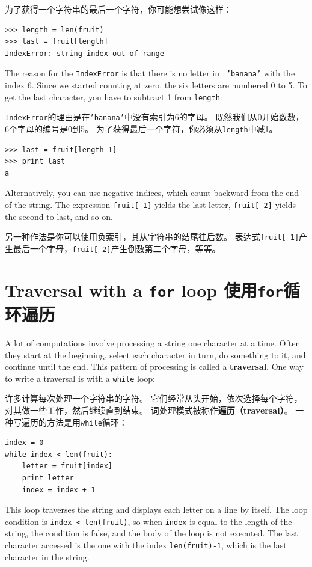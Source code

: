 \documentclass[10pt]{book}
\begin{document}
\begin{CJK}{UTF8}{gbsn}
为了获得一个字符串的最后一个字符，你可能想尝试像这样：

\begin{verbatim}
>>> length = len(fruit)
>>> last = fruit[length]
IndexError: string index out of range
\end{verbatim}
%
The reason for the {\tt IndexError} is that there is no letter in {\tt
'banana'} with the index 6.  Since we started counting at zero, the
six letters are numbered 0 to 5.  To get the last character, you have
to subtract 1 from {\tt length}:

{\tt IndexError}的理由是在{\tt 'banana'}中没有索引为6的字母。
既然我们从0开始数数，6个字母的编号是0到5。
为了获得最后一个字符，你必须从{\tt length}中减1。

\begin{verbatim}
>>> last = fruit[length-1]
>>> print last
a
\end{verbatim}
%
Alternatively, you can use negative indices, which count backward from
the end of the string.  The expression {\tt fruit[-1]} yields the last
letter, {\tt fruit[-2]} yields the second to last, and so on.

另一种作法是你可以使用负索引，其从字符串的结尾往后数。
表达式{\tt fruit[-1]}产生最后一个字母，{\tt fruit[-2]}产生倒数第二个字母，等等。


\section{Traversal with a {\tt for} loop 使用{\tt for}循环遍历}
\label{for}

A lot of computations involve processing a string one character at a
time.  Often they start at the beginning, select each character in
turn, do something to it, and continue until the end.  This pattern of
processing is called a {\bf traversal}.  One way to write a traversal
is with a {\tt while} loop:

许多计算每次处理一个字符串的字符。
它们经常从头开始，依次选择每个字符，对其做一些工作，然后继续直到结束。
词处理模式被称作{\bf 遍历（traversal）}。
一种写遍历的方法是用{\tt while}循环：

\begin{verbatim}
index = 0
while index < len(fruit):
    letter = fruit[index]
    print letter
    index = index + 1
\end{verbatim}
%
This loop traverses the string and displays each letter on a line by
itself.  The loop condition is {\tt index < len(fruit)}, so
when {\tt index} is equal to the length of the string, the
condition is false, and the body of the loop is not executed.  The
last character accessed is the one with the index {\tt len(fruit)-1},
which is the last character in the string.


\end{CJK}
\end{document}
